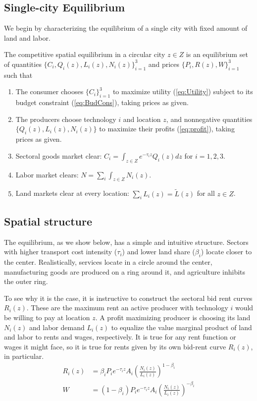 \documentclass[12pt]{article}
\begin{document}
\subsection{Single-city Equilibrium}
We begin by characterizing the equilibrium of a single city with fixed amount of land and labor.

The competitive spatial equilibrium in a circular city $z\in Z$ is an equilibrium set of quantities $\{C_i, Q_i(z), L_i(z), N_i(z)\}_{i=1}^3$ and prices $\{P_i, R(z), W\}_{i=1}^3$ such that
\begin{enumerate}
    \item The consumer chooses $\{C_i\}_{i=1}^3$ to maximize utility (\ref{eq:Utility}) subject to its budget constraint (\ref{eq:BudCons}), taking prices as given.
    \item The producers choose technology $i$ and location $z$, and nonnegative quantities $\{Q_i(z), L_i(z), N_i(z)\}$ to maximize their profits (\ref{eq:profit}), taking prices as given.
    \item Sectoral goods market clear: $C_i=\int_{z\in Z} e^{-\tau_iz}Q_i(z)dz$ for $i=1,2,3$.
    \item Labor market clears: $N=\sum_i\int_{z\in Z} N_i(z)$.
    \item Land markets clear at every location: $\sum_iL_i(z)=\tilde L(z)$ for all $z\in Z$.
\end{enumerate}

\subsection{Spatial structure}
The equilibrium, as we show below, has a simple and intuitive structure. Sectors with higher transport cost intensity ($\tau_i$) and lower land share ($\beta_i$) locate closer to the center. Realistically, services locate in a circle around the center, manufacturing goods are produced on a ring around it, and agriculture inhibits the outer ring.

To see why it is the case, it is instructive to construct the sectoral bid rent curves $R_i(z)$. These are the maximum rent an active producer with technology $i$ would be willing to pay at location $z$. %
A profit maximizing producer is choosing its land $N_i(z)$ and labor demand $L_i(z)$ to equalize the value marginal product of land and labor to rents and wages, respectively. It is true for any rent function or wages it might face, so it is true for rents given by its own bid-rent curve $R_i(z)$, in particular.
\begin{align}
R_i(z) &=\beta_i P_ie^{-\tau_i z}A_i \left(\frac{N_i(z)}{L_i(z)}\right)^{1-\beta_i}\\
W &=(1-\beta_i) P_ie^{-\tau_i z}A_i \left(\frac{N_i(z)}{L_i(z)}\right)^{-\beta_i}
\end{align}
\end{document}
